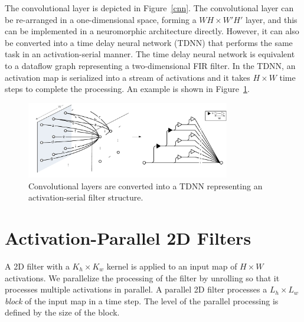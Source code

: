 \documentclass[journal]{IEEEtran}
\begin{document}
The convolutional layer is depicted in Figure~\ref{cnn}. The convolutional layer can be re-arranged in a one-dimensional space, forming a $WH \times W'H'$ layer, and this can be implemented in a neuromorphic architecture directly. However, it can also be converted into a time delay neural network (TDNN) that performs the same task in an activation-serial manner. The time delay neural network is equivalent to a dataflow graph representing a two-dimensional FIR filter. In the TDNN, an activation map is serialized into a stream of activations and it takes $H\times W$ time steps to complete the processing.  An example is shown in Figure~\ref{conv2tdnn}.
\begin{figure}[h]
\centering
\includegraphics[width = 3.5in]{./FIGURES/fig2.pdf}
\caption {Convolutional layers are converted into a TDNN representing an activation-serial filter structure.} \label{conv2tdnn}
\end{figure}



\section{Activation-Parallel 2D Filters}
A 2D filter with a $K_h\times K_w$ kernel is applied to an input map of $H\times W$ activations. We parallelize the processing of the filter by unrolling so that it processes multiple activations in parallel. A parallel 2D filter processes a $L_h \times L_w$ \textit{block} of the input map in a time step. 
The level of the parallel processing is defined by the size of the block.
\end{document}
